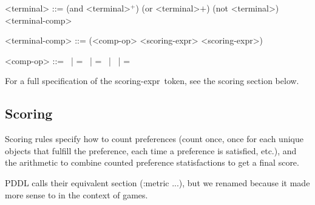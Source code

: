 \documentclass{article}
\begin{document}
\begin{grammar}
<terminal> ::= (and <terminal>$^+$) \alt
        (or <terminal>$+$) \alt
        (not <terminal>) \alt
        <terminal-comp>

<terminal-comp> ::= (<comp-op> <scoring-expr> <scoring-expr>)

    <comp-op> ::=  \textlangle \ | \textlangle = \ | = \ | \textrangle \ | \textrangle =



\end{grammar}
For a full specification of the \textlangle scoring-expr\textrangle\ token, see the scoring section below.



\subsection{Scoring}
Scoring rules specify how to count preferences (count once, once for each unique objects that fulfill the preference, each time a preference is satisfied, etc.), and the arithmetic to combine
        counted preference statisfactions to get a final score.

        PDDL calls their equivalent section (:metric ...), but we renamed because it made more sense to in the context of games.
\end{document}
